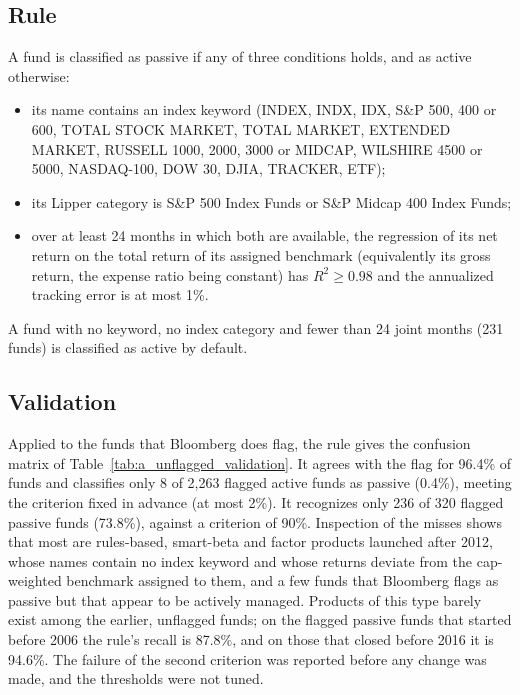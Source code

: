 \documentclass[12pt, oneside]{report}
\begin{document}
\subsection{Rule}

\noindent A fund is classified as passive if any of three
conditions holds, and as active otherwise:
\begin{itemize}
\item its name contains an index keyword (INDEX, INDX, IDX, S\&P 500, 400
or 600, TOTAL STOCK MARKET, TOTAL MARKET, EXTENDED MARKET, RUSSELL 1000,
2000, 3000 or MIDCAP, WILSHIRE 4500 or 5000, NASDAQ-100, DOW 30, DJIA,
TRACKER, ETF);
\item its Lipper category is S\&P 500 Index Funds or S\&P Midcap 400
Index Funds;
\item over at least 24 months in which both are available, the
regression of its net return on the total return of its assigned
benchmark (equivalently its gross return, the expense ratio being
constant) has $R^2 \ge 0.98$ and the annualized tracking error is at most
1\%.
\end{itemize}
A fund with no keyword, no index category and fewer than 24 joint
months (231 funds) is classified as active by default.

\subsection{Validation}

\noindent Applied to the funds that Bloomberg does flag,
the rule gives the confusion matrix of Table~\ref{tab:a_unflagged_validation}.
It agrees with the flag for 96.4\% of funds and classifies only 8 of
2{,}263 flagged active funds as passive (0.4\%), meeting the criterion
fixed in advance (at most 2\%). It recognizes only 236 of 320 flagged
passive funds (73.8\%), against a criterion of 90\%. Inspection of the
misses shows that most are rules-based, smart-beta and factor products
launched after 2012, whose names contain no index keyword and whose
returns deviate from the cap-weighted benchmark assigned to them, and a
few funds that Bloomberg flags as passive but that appear to be actively
managed. Products of this type barely exist among the earlier, unflagged
funds; on the flagged passive funds that started before 2006 the rule's
recall is 87.8\%, and on those that closed before 2016 it is 94.6\%. The
failure of the second criterion was reported before any change was
made, and the thresholds were not tuned.
\end{document}
